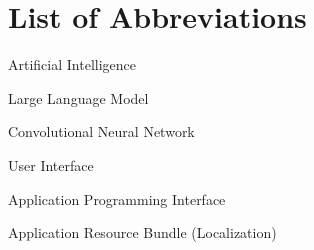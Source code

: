 
\newpage
\chapter*{List of Abbreviations}

\begin{abbreviations}
\item[AI] Artificial Intelligence
\item[LLM] Large Language Model
\item[CNN] Convolutional Neural Network
\item[UI] User Interface
\item[API] Application Programming Interface
\item[ARB] Application Resource Bundle (Localization)
\end{abbreviations}
